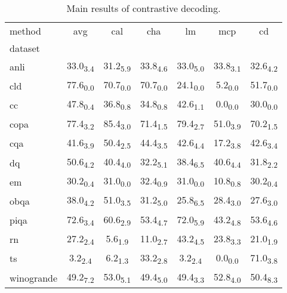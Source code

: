\begin{table}[h]
\centering
\caption{Main results of contrastive decoding.}
\label{tab:cd_main}
\begin{tabular}{lcccccc}
method & avg & cal & cha & lm & mcp & cd \\
dataset &  &  &  &  &  &  \\
anli & 33.0\textsubscript{3.4} & 31.2\textsubscript{5.9} & 33.8\textsubscript{4.6} & 33.0\textsubscript{5.0} & 33.8\textsubscript{3.1} & 32.6\textsubscript{4.2} \\
cld & 77.6\textsubscript{0.0} & 70.7\textsubscript{0.0} & 70.7\textsubscript{0.0} & 24.1\textsubscript{0.0} & 5.2\textsubscript{0.0} & 51.7\textsubscript{0.0} \\
cc & 47.8\textsubscript{0.4} & 36.8\textsubscript{0.8} & 34.8\textsubscript{0.8} & 42.6\textsubscript{1.1} & 0.0\textsubscript{0.0} & 30.0\textsubscript{0.0} \\
copa & 77.4\textsubscript{3.2} & 85.4\textsubscript{3.0} & 71.4\textsubscript{1.5} & 79.4\textsubscript{2.7} & 51.0\textsubscript{3.9} & 70.2\textsubscript{1.5} \\
cqa & 41.6\textsubscript{3.9} & 50.4\textsubscript{2.5} & 44.4\textsubscript{3.5} & 42.6\textsubscript{4.4} & 17.2\textsubscript{3.8} & 42.6\textsubscript{3.4} \\
dq & 50.6\textsubscript{4.2} & 40.4\textsubscript{4.0} & 32.2\textsubscript{5.1} & 38.4\textsubscript{6.5} & 40.6\textsubscript{4.4} & 31.8\textsubscript{2.2} \\
em & 30.2\textsubscript{0.4} & 31.0\textsubscript{0.0} & 32.4\textsubscript{0.9} & 31.0\textsubscript{0.0} & 10.8\textsubscript{0.8} & 30.2\textsubscript{0.4} \\
obqa & 38.0\textsubscript{4.2} & 51.0\textsubscript{3.5} & 31.2\textsubscript{5.0} & 25.8\textsubscript{6.5} & 28.4\textsubscript{3.0} & 27.6\textsubscript{3.0} \\
piqa & 72.6\textsubscript{3.4} & 60.6\textsubscript{2.9} & 53.4\textsubscript{4.7} & 72.0\textsubscript{5.9} & 43.2\textsubscript{4.8} & 53.6\textsubscript{4.6} \\
rn & 27.2\textsubscript{2.4} & 5.6\textsubscript{1.9} & 11.0\textsubscript{2.7} & 43.2\textsubscript{4.5} & 23.8\textsubscript{3.3} & 21.0\textsubscript{1.9} \\
ts & 3.2\textsubscript{2.4} & 6.2\textsubscript{1.3} & 33.2\textsubscript{2.8} & 3.2\textsubscript{2.4} & 0.0\textsubscript{0.0} & 71.0\textsubscript{3.8} \\
winogrande & 49.2\textsubscript{7.2} & 53.0\textsubscript{5.1} & 49.4\textsubscript{5.0} & 49.4\textsubscript{3.3} & 52.8\textsubscript{4.0} & 50.4\textsubscript{8.3} \\
\end{tabular}
\end{table}

